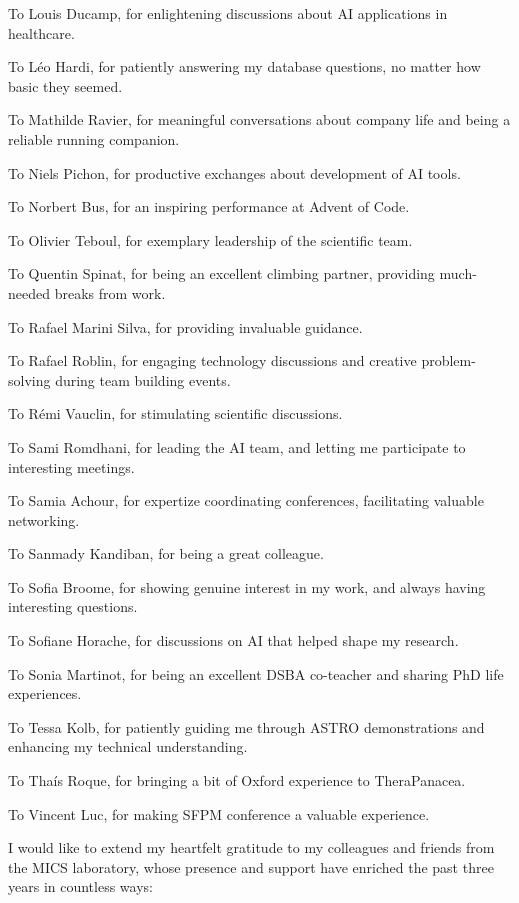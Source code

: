 To Louis Ducamp, for enlightening discussions about AI applications in healthcare.

To Léo Hardi, for patiently answering my database questions, no matter how basic they seemed.

To Mathilde Ravier, for meaningful conversations about company life and being a reliable running companion.

To Niels Pichon, for productive exchanges about development of AI tools.

To Norbert Bus, for an inspiring performance at Advent of Code.

To Olivier Teboul, for exemplary leadership of the scientific team.

To Quentin Spinat, for being an excellent climbing partner, providing much-needed breaks from work.

To Rafael Marini Silva, for providing invaluable guidance.

To Rafael Roblin, for engaging technology discussions and creative problem-solving during team building events.

To Rémi Vauclin, for stimulating scientific discussions.

To Sami Romdhani, for leading the AI team, and letting me participate to interesting meetings.

To Samia Achour, for expertize coordinating conferences, facilitating valuable networking.

To Sanmady Kandiban, for being a great colleague.

To Sofia Broome, for showing genuine interest in my work, and always having interesting questions.

To Sofiane Horache, for discussions on AI that helped shape my research.

To Sonia Martinot, for being an excellent DSBA co-teacher and sharing PhD life experiences.

To Tessa Kolb, for patiently guiding me through ASTRO demonstrations and enhancing my technical understanding.

To Thaís Roque, for bringing a bit of Oxford experience to TheraPanacea.

To Vincent Luc, for making SFPM conference a valuable experience.



I would like to extend my heartfelt gratitude to my colleagues and friends from the MICS laboratory, whose presence and support have enriched the past three years in countless ways:

